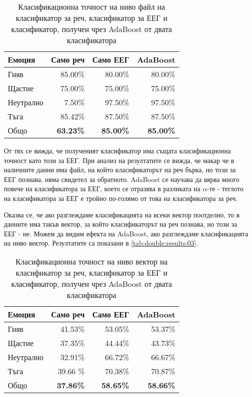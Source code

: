 \documentclass[main.tex]{subfiles}
\begin{document}
\begin{table}[h]
    \begin{center}
    \begin{tabular}{|l|r r r|} 
        \hline
        Емоция & Само реч & Само ЕЕГ & AdaBoost \\ 
        \hline
        Гняв & 85.00\% & 80.00\% & 80.00\%\\ 
        Щастие & 75.00\% & 75.00\% & 75.00\%\\ 
        Неутрално & 7.50\% & 97.50\% & 97.50\%\\ 
        Тъга & 85.42\% & 87.50\% & 87.50\%\\ 
        \hline
        \hline
        Общо & \textbf{63.23\%} & \textbf{85.00\%} &  \textbf{85.00\%}\\
        \hline
    \end{tabular}
    \caption{Класификационна точност на ниво файл на класификатор за реч, класификатор за ЕЕГ и класификатор, получен чрез AdaBoost от двата класификатора}
    \label{tab:double:results:02}
    \end{center}
\end{table}

От тях се вижда, че полученият класификатор има същата класификационна точност като този за ЕЕГ. При анализ на резултатите се вижда, че макар че в наличните данни има файл, на който класификаторът на реч бърка, но този за ЕЕГ познава, няма свидетел за обратното. AdaBoost се научава да вярва много повече на класификатора за ЕЕГ, което се отразява в разликата на $\alpha$-те - теглото на класификатора за ЕЕГ е тройно по-голямо от това на класификатора за реч. 

Оказва се, че ако разглеждаме класификацията на всеки вектор поотделно, то в данните има такъв вектор, за който класификаторът на реч познава, но този за ЕЕГ - не.
Можем да видим ефекта на AdaBoost, ако разглеждаме класификацията на ниво вектор. Резултатите са показани в \autoref{tab:double:results:03}.
\begin{table}[h]
    \begin{center}
    \begin{tabular}{|l|r r r|} 
        \hline
        Емоция & Само реч & Само ЕЕГ & AdaBoost \\ 
        \hline
        Гняв &  41.53\% & 53.05\% & 53.37\%\\ 
        Щастие &  37.35\% & 44.44\%  & 43.73\%\\ 
        Неутрално & 32.91\% & 66.72\%  & 66.67\%\\ 
        Тъга & 39.66 \% & 70.38\% & 70.87\%\\ 
        \hline
        \hline
        Общо & \textbf{37.86\%} & \textbf{58.65\%} &  \textbf{58.66\%}\\
        \hline
    \end{tabular}
    \caption{Класификационна точност на ниво вектор на класификатор за реч, класификатор за ЕЕГ и класификатор, получен чрез AdaBoost от двата класификатора}
    \label{tab:double:results:03}
    \end{center}
\end{table}
\end{document}
